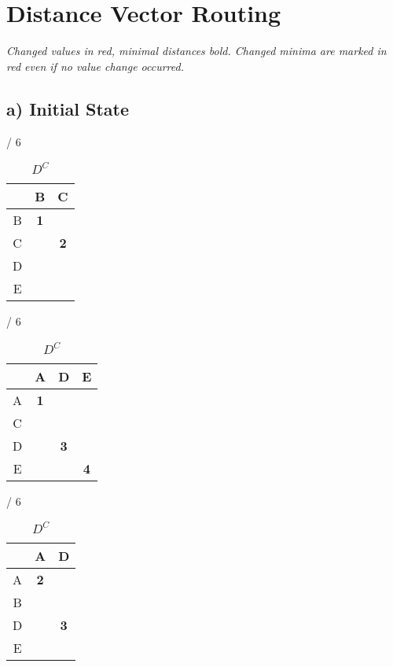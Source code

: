 \documentclass[a4paper, 11 pt, article, accentcolor=tud7b]{tudreport}
\begin{document}
	\section{Distance Vector Routing}
	
	\textit{Changed values in red, minimal distances bold. Changed minima are marked in red even if no value change occurred.}
	
	\subsection*{a) Initial State}
	\begin{table}[h]
	  \begin{subtable}[b]{\textwidth / 6}
	    \begin{tabular}{| c | c | c |}
	      \hline
	        & B & C \\ \hline
	      B & \textbf{1} &   \\ \hline
	      C &   & \textbf{2} \\ \hline
	      D &   &   \\ \hline
	      E &   &   \\ \hline
	    \end{tabular}
	    \caption{$D^{A}$}
	  \end{subtable}
	  \hfill
	  \begin{subtable}[b]{\textwidth / 6}
	    \begin{tabular}{| c | c | c | c |}
	    \hline
	      & A & D & E \\ \hline
	    A & \textbf{1} &   &   \\ \hline
	    C &   &   &   \\ \hline
	    D &   & \textbf{3} &   \\ \hline
	    E &   &   & \textbf{4} \\ \hline
	    \end{tabular}
	    \caption{$D^{B}$}
	  \end{subtable}
	  \hfill
	  \begin{subtable}[b]{\textwidth / 6}
	    \begin{tabular}{| c | c | c |}
	    \hline
	      & A & D \\ \hline
	    A & \textbf{2} &   \\ \hline
	    B &   &   \\ \hline
	    D &   & \textbf{3} \\ \hline
	    E &   &   \\ \hline
	    \end{tabular}
	    \caption{$D^{C}$}

\end{subtable}
\end{table}
\end{document}
